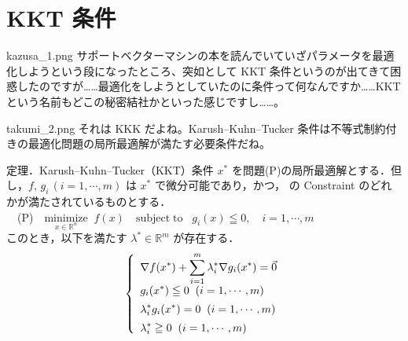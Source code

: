 \documentclass[b5paper,xelatex,ja=standard,10pt]{bxjsarticle}
\begin{document}

\newpage
\newcommand*{\mysectiontitle}{KKT 条件}
\section*{\mysectiontitle}
\addcontentsline{toc}{section}{\mysectiontitle}
\vspace{3pt}

\begin{SERIFU}[colback=PaleIris, colbacktitle=PaleIris2]{kazusa_1.png}
サポートベクターマシンの本を読んでいていざパラメータを最適化しようという段になったところ、突如として KKT 条件というのが出てきて困惑したのですが……最適化をしようとしていたのに条件って何なんですか……KKT という名前もどこの秘密結社かといった感じですし……。
\end{SERIFU}

\begin{SERIFU}[colback=PaleGold, colbacktitle=PaleGold2]{takumi_2.png}
それは KKK だよね。Karush–Kuhn–Tucker 条件は不等式制約付きの最適化問題の局所最適解が満たす必要条件だね。
\end{SERIFU}

\begin{PROP}[colback=White]{定理．Karush–Kuhn–Tucker（KKT）条件}
$x^\ast$ を問題(P)の局所最適解とする．但し，$f, \, g_i \, (i = 1, \cdots, m)$ は $x^\ast$ で微分可能であり，かつ，\cite{constraint_qualifications} の Constraint のどれかが満たされているものとする．
\\[3pt]
　(P)　$\displaystyle \underset{x \in \mathbb{R}^n}{\mathrm{minimize}} \; \; f(x)  \quad  \mathrm{subject \; to}   \; \; \; g_i(x) \leqq 0,  \quad i = 1, \cdots, m $
\\[3pt]
このとき，以下を満たす $\lambda^\ast \in \mathbb{R}^m$ が存在する．
\begin{eqnarray*}
\left\{
\begin{array}{l}
\displaystyle \nabla f (x^\ast) + \sum_{i=1}^m \lambda^\ast_i \nabla g_i (x^\ast) = \vec{0} \\[5pt]
\displaystyle g_i(x^\ast) \leqq 0 \; \; (i = 1, \cdots, m) \\[5pt]
\displaystyle \lambda^\ast_i g_i (x^\ast) = 0 \; \; (i = 1, \cdots, m) \\[5pt]
\displaystyle \lambda^\ast_i \geqq 0 \; \; (i = 1, \cdots, m) \notag
\end{array}
\right.
\end{eqnarray*}
\end{PROP}
\end{document}
